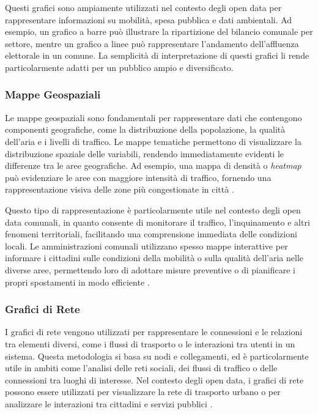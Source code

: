 Questi grafici sono ampiamente utilizzati nel contesto degli open data per rappresentare informazioni su mobilità, spesa pubblica e dati ambientali. Ad esempio, un grafico a barre può illustrare la ripartizione del bilancio comunale per settore, mentre un grafico a linee può rappresentare l’andamento dell'affluenza elettorale in un comune. La semplicità di interpretazione di questi grafici li rende particolarmente adatti per un pubblico ampio e diversificato.

\subsubsection{Mappe Geospaziali}
Le mappe geospaziali sono fondamentali per rappresentare dati che contengono componenti geografiche, come la distribuzione della popolazione, la qualità dell'aria e i livelli di traffico. Le mappe tematiche permettono di visualizzare la distribuzione spaziale delle variabili, rendendo immediatamente evidenti le differenze tra le aree geografiche. Ad esempio, una mappa di densità o \textit{heatmap} può evidenziare le aree con maggiore intensità di traffico, fornendo una rappresentazione visiva delle zone più congestionate in città \cite{Peterson2014}.

Questo tipo di rappresentazione è particolarmente utile nel contesto degli open data comunali, in quanto consente di monitorare il traffico, l’inquinamento e altri fenomeni territoriali, facilitando una comprensione immediata delle condizioni locali. Le amministrazioni comunali utilizzano spesso mappe interattive per informare i cittadini sulle condizioni della mobilità o sulla qualità dell'aria nelle diverse aree, permettendo loro di adottare misure preventive o di pianificare i propri spostamenti in modo efficiente \cite{Davies2019}.

\subsubsection{Grafici di Rete}
I grafici di rete vengono utilizzati per rappresentare le connessioni e le relazioni tra elementi diversi, come i flussi di trasporto o le interazioni tra utenti in un sistema. Questa metodologia si basa su nodi e collegamenti, ed è particolarmente utile in ambiti come l'analisi delle reti sociali, dei flussi di traffico o delle connessioni tra luoghi di interesse. Nel contesto degli open data, i grafici di rete possono essere utilizzati per visualizzare la rete di trasporto urbano o per analizzare le interazioni tra cittadini e servizi pubblici \cite{Kanza2019}.

